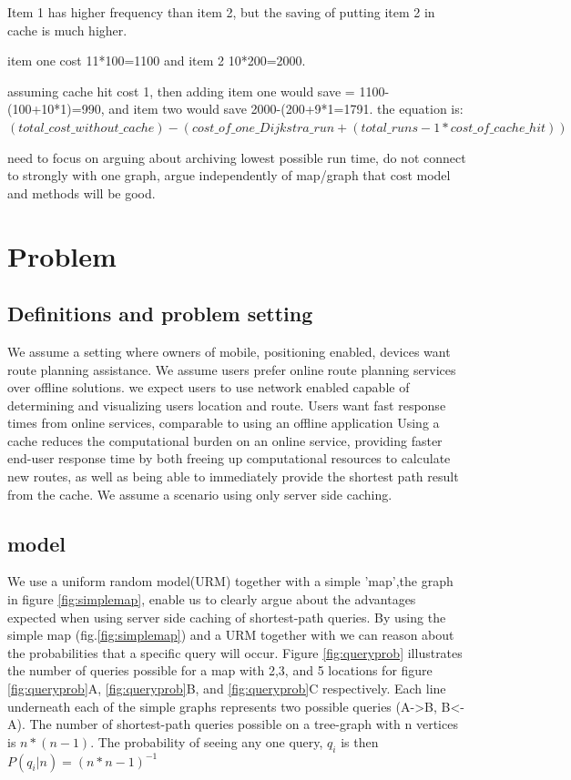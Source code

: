 Item 1 has higher frequency than item 2, but the saving of putting item 2 in cache is much higher. 

item one cost 11*100=1100 and  item 2 10*200=2000. 

assuming cache hit cost 1, then adding item one would save = 1100-(100+10*1)=990, and item two would save 2000-(200+9*1=1791. the equation is: $(total\_cost\_without\_cache) - (cost\_of\_one\_Dijkstra\_run + (total\_runs-1 * cost\_of\_cache\_hit))$

need to focus on arguing about archiving lowest possible run time, do not connect to strongly with one graph, argue independently of map/graph that cost model and methods will be good.
\ffh{}

\section{Problem}

\subsection{Definitions and problem setting}
We assume a setting where owners of mobile, positioning enabled, devices want route planning assistance. We assume users prefer online route planning services over offline solutions. 
we expect users to use network enabled capable of determining and visualizing users location and route.
Users want fast response times from online services, comparable to using an offline application \cite{ref}
Using a cache reduces the computational burden \cite{ref} on an online service, providing faster end-user response time \cite{ref} by both freeing up computational resources to calculate new routes, as well as being able to immediately provide the shortest  path result from the cache.
We assume a scenario using only server side caching.


\subsection{model}

 
We use a uniform random model(URM) together with a simple 'map',the graph in figure \ref{fig:simplemap}, enable us to clearly argue about the advantages expected when using server side caching of shortest-path queries. By using the simple map (fig.\ref{fig:simplemap}) and a URM together with we can reason about the probabilities that a specific query will occur. Figure \ref{fig:queryprob} illustrates the number of queries possible for a map with 2,3, and 5 locations for figure \ref{fig:queryprob}A, \ref{fig:queryprob}B, and \ref{fig:queryprob}C respectively. Each line underneath each of the simple graphs represents two possible queries (A->B, B<-A). The number of shortest-path queries possible on a tree-graph with n vertices is $n*(n-1)$. The probability of seeing any one query, $q_i$ is then $P(q_i | n) = (n*n-1)^{-1}$



